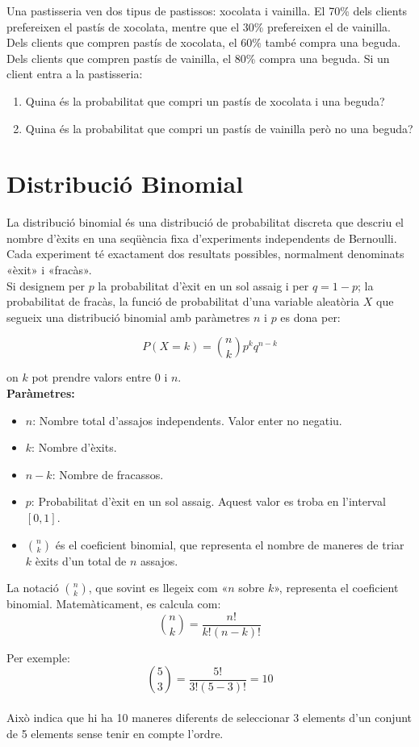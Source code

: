 \documentclass[12pt]{article}
\begin{document}
\begin{exercici} [title=Exercici 5] \noindent 
Una pastisseria ven dos tipus de pastissos: xocolata i vainilla. El 70\% dels clients prefereixen el pastís de xocolata, mentre que el 30\% prefereixen el de vainilla. Dels clients que compren pastís de xocolata, el 60\% també compra una beguda. Dels clients que compren pastís de vainilla, el 80\% compra una beguda. Si un client entra a la pastisseria:
\begin{enumerate}
    \item Quina és la probabilitat que compri un pastís de xocolata i una beguda?
    \item Quina és la probabilitat que compri un pastís de vainilla però no una beguda?
\end{enumerate}
\end{exercici}

\section{Distribució Binomial}

\begin{concept} [title=Deficició] \noindent
La distribució binomial és una distribució de probabilitat discreta que descriu el nombre d'èxits en una seqüència fixa d'experiments independents de Bernoulli. Cada experiment té exactament dos resultats possibles, normalment denominats «èxit» i «fracàs».\\ 

Si designem per $p$ la probabilitat d'èxit en un sol assaig i per $q=1-p$; la probabilitat de fracàs, la funció de probabilitat d'una variable aleatòria $X$ que segueix una distribució binomial amb paràmetres $n$ i $p$ es dona per:

\[
P(X=k) = \binom{n}{k} p^k q^{n-k}
\]

on $k$ pot prendre valors entre $0$ i $n$.\\

\textbf{Paràmetres:}
\begin{itemize}
    \item $n$: Nombre total d'assajos independents. Valor enter no negatiu.
    \item $k$: Nombre d'èxits.
    \item $n-k$: Nombre de fracassos.
    \item $p$: Probabilitat d'èxit en un sol assaig. Aquest valor es troba en l'interval $[0,1]$.
    \item $\binom{n}{k}$ és el coeficient binomial, que representa el nombre de maneres de triar $k$ èxits d'un total de $n$ assajos.
\end{itemize}

La notació $\binom{n}{k}$, que sovint es llegeix com «$n$ sobre $k$», representa el coeficient binomial. Matemàticament, es calcula com:
\[
\binom{n}{k} = \frac{n!}{k!(n-k)!}
\]

Per exemple:
\[
\binom{5}{3} = \frac{5!}{3!(5-3)!} = 10
\]\\

Això indica que hi ha 10 maneres diferents de seleccionar 3 elements d'un conjunt de 5 elements sense tenir en compte l'ordre.
\end{concept}
\end{document}
